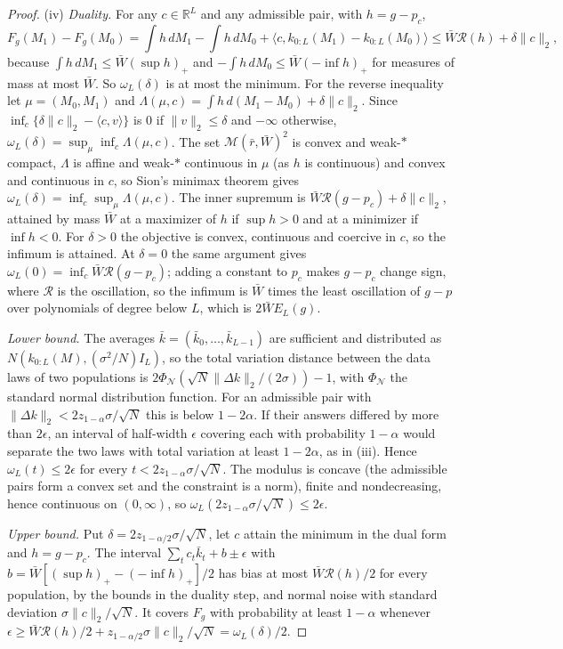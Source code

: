 \begin{proof}
(iv) \emph{Duality.} For any $c\in\mathbb R^L$ and any admissible pair, with $h=g-p_c$,
\[
 F_g(M_1)-F_g(M_0)=\int h\,dM_1-\int h\,dM_0+\langle c,k_{0:L}(M_1)-k_{0:L}(M_0)\rangle\le\bar W\mathcal R(h)+\delta\|c\|_2,
\]
because $\int h\,dM_1\le\bar W(\sup h)_+$ and $-\int h\,dM_0\le\bar W(-\inf h)_+$ for measures of mass at most $\bar W$. So $\omega_L(\delta)$ is at most the minimum. For the reverse inequality let $\mu=(M_0,M_1)$ and $\Lambda(\mu,c)=\int h\,d(M_1-M_0)+\delta\|c\|_2$. Since $\inf_c\{\delta\|c\|_2-\langle c,v\rangle\}$ is $0$ if $\|v\|_2\le\delta$ and $-\infty$ otherwise, $\omega_L(\delta)=\sup_\mu\inf_c\Lambda(\mu,c)$. The set $\mathcal M(\bar r,\bar W)^2$ is convex and weak-$*$ compact, $\Lambda$ is affine and weak-$*$ continuous in $\mu$ (as $h$ is continuous) and convex and continuous in $c$, so Sion's minimax theorem gives $\omega_L(\delta)=\inf_c\sup_\mu\Lambda(\mu,c)$. The inner supremum is $\bar W\mathcal R(g-p_c)+\delta\|c\|_2$, attained by mass $\bar W$ at a maximizer of $h$ if $\sup h>0$ and at a minimizer if $\inf h<0$. For $\delta>0$ the objective is convex, continuous and coercive in $c$, so the infimum is attained. At $\delta=0$ the same argument gives $\omega_L(0)=\inf_c\bar W\mathcal R(g-p_c)$; adding a constant to $p_c$ makes $g-p_c$ change sign, where $\mathcal R$ is the oscillation, so the infimum is $\bar W$ times the least oscillation of $g-p$ over polynomials of degree below $L$, which is $2\bar WE_L(g)$.

\emph{Lower bound.} The averages $\bar k=(\bar k_0,\ldots,\bar k_{L-1})$ are sufficient and distributed as $N(k_{0:L}(M),(\sigma^2/N)I_L)$, so the total variation distance between the data laws of two populations is $2\Phi_{\mathcal N}(\sqrt N\|\Delta k\|_2/(2\sigma))-1$, with $\Phi_{\mathcal N}$ the standard normal distribution function. For an admissible pair with $\|\Delta k\|_2<2z_{1-\alpha}\sigma/\sqrt N$ this is below $1-2\alpha$. If their answers differed by more than $2\epsilon$, an interval of half-width $\epsilon$ covering each with probability $1-\alpha$ would separate the two laws with total variation at least $1-2\alpha$, as in (iii). Hence $\omega_L(t)\le2\epsilon$ for every $t<2z_{1-\alpha}\sigma/\sqrt N$. The modulus is concave (the admissible pairs form a convex set and the constraint is a norm), finite and nondecreasing, hence continuous on $(0,\infty)$, so $\omega_L(2z_{1-\alpha}\sigma/\sqrt N)\le2\epsilon$.

\emph{Upper bound.} Put $\delta=2z_{1-\alpha/2}\sigma/\sqrt N$, let $c$ attain the minimum in the dual form and $h=g-p_c$. The interval $\sum_tc_t\bar k_t+b\pm\epsilon$ with $b=\bar W[(\sup h)_+-(-\inf h)_+]/2$ has bias at most $\bar W\mathcal R(h)/2$ for every population, by the bounds in the duality step, and normal noise with standard deviation $\sigma\|c\|_2/\sqrt N$. It covers $F_g$ with probability at least $1-\alpha$ whenever $\epsilon\ge\bar W\mathcal R(h)/2+z_{1-\alpha/2}\sigma\|c\|_2/\sqrt N=\omega_L(\delta)/2$.


\end{proof}

